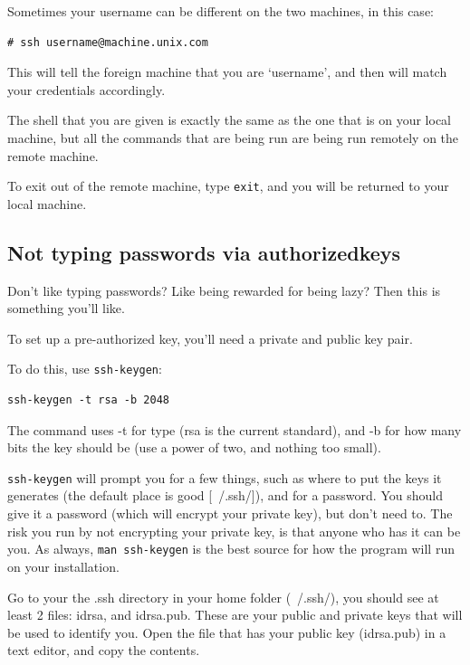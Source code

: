 Sometimes your username can be different on the two machines, in this case:

\begin{verbatim}
# ssh username@machine.unix.com 
\end{verbatim}

This will tell the foreign machine that you are `username', and then will
match your credentials accordingly. 

The shell that you are given is exactly the same as the one that is on your local 
machine, but all the commands that are being run are being run 
remotely on the remote machine.

To exit out of the remote machine, type {\tt exit}, and you will be returned 
to your local machine.  

\subsection{Not typing passwords via authorized\textunderscore keys}
\label{subsection:sshkeys}
Don't like typing passwords? Like being rewarded for being lazy? Then this 
is something you'll like.

To set up a pre-authorized key, you'll need a private and public key pair.

To do this, use {\tt ssh-keygen}:

\begin{verbatim}
ssh-keygen -t rsa -b 2048
\end{verbatim}

The command uses -t for type (rsa 
is the current standard), and -b for how 
many bits the key should be (use a power of two, and nothing too small).

{\tt ssh-keygen} will prompt you for a few things, such as where to put the
keys it generates (the default place is good [~/.ssh/]), and for a password.
You should give it a password (which will encrypt your private key), but don't need to. 
The risk you run by not encrypting your private key, is that anyone who has it
can be you. As always, {\tt man ssh-keygen} is the best source for how the
program will run on your installation.

Go to your the .ssh directory in your home folder (~/.ssh/), you should see at 
least 2 files: id\textunderscore rsa, and id\textunderscore rsa.pub. These are your public and private keys
that will be used to identify you.  Open the file that has your public key (id\textunderscore rsa.pub)
in a text editor, and copy the contents.

